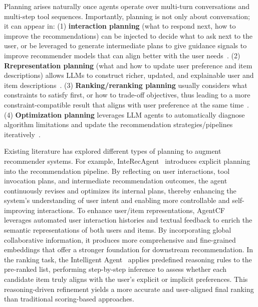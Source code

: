 {{{{Planning arises naturally once agents operate over multi-turn conversations and multi-step tool sequences. Importantly, planning is not only about conversation; it can appear in:
(1) \textbf{interaction planning} (\eg what to respond next, how to improve the recommendations) can be injected to decide what to ask next to the user, or be leveraged to generate intermediate plans to give guidance signals to improve recommender models that can align better with the user needs~\cite{huang2024interecagent,feng2025expectation}. 
(2) \textbf{Rrepresentation planning} (\eg what and how to update user preference and item descriptions) allows LLMs to construct richer, updated, and explainable user and item descriptions~\cite{zhang2023agentcf,liu2025agentcf++, xie2026agentictagger}.
(3) \textbf{Ranking/reranking planning} usually considers what constraints to satisfy first, or how to trade-off objectives, thus leading to a more constraint-compatible result that aligns with user preference at the same time~\cite{yu2025thought,yu2025intelligent_agent,shi2024large}.}
(4) \textbf{Optimization planning} leverages LLM agents to automatically diagnose algorithm limitations and update the recommendation strategies/pipelines iteratively~\cite{lao2026agentx,wang2026self}.

Existing literature has explored different types of planning to augment recommender systems. 
For example, InteRecAgent~\cite{huang2024interecagent} introduces explicit planning into the recommendation pipeline. 
By reflecting on user interactions, tool invocation plans, and intermediate recommendation outcomes, the agent continuously revises and optimizes its internal plans, thereby enhancing the system’s understanding of user intent and enabling more controllable and self-improving interactions. 
To enhance user/item representations, AgentCF~\cite{zhang2023agentcf} leverages automated user interaction histories and textual feedback to enrich the semantic representations of both users and items. By incorporating global collaborative information, it produces more comprehensive and fine-grained embeddings that offer a stronger foundation for downstream recommendation. In the ranking task, the Intelligent Agent~\cite{yu2025intelligent_agent} applies predefined reasoning rules to the pre-ranked list, performing step-by-step inference to assess whether each candidate item truly aligns with the user’s explicit or implicit preferences. This reasoning-driven refinement yields a more accurate and user-aligned final ranking than traditional scoring-based approaches.



}}}
